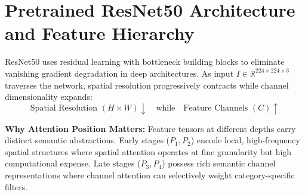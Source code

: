 \documentclass[11pt,a4paper]{article}
\begin{document}
\section{Pretrained ResNet50 Architecture and Feature Hierarchy}
ResNet50 uses residual learning with bottleneck building blocks to eliminate vanishing gradient degradation in deep architectures. As input $I \in \mathbb{R}^{224 \times 224 \times 3}$ traverses the network, spatial resolution progressively contracts while channel dimensionality expands:
\begin{equation}
\text{Spatial Resolution } (H \times W) \downarrow \quad \text{while} \quad \text{Feature Channels } (C) \uparrow
\end{equation}

\begin{table}[H]
\centering
\caption{Stage-wise feature dimensions and candidate attention insertion points in ResNet50.}
\label{tab:resnet_stages}
\end{table}

\noindent \textbf{Why Attention Position Matters:} Feature tensors at different depths carry distinct semantic abstractions. Early stages ($P_1, P_2$) encode local, high-frequency spatial structures where spatial attention operates at fine granularity but high computational expense. Late stages ($P_3, P_4$) possess rich semantic channel representations where channel attention can selectively weight category-specific filters.

\end{document}
